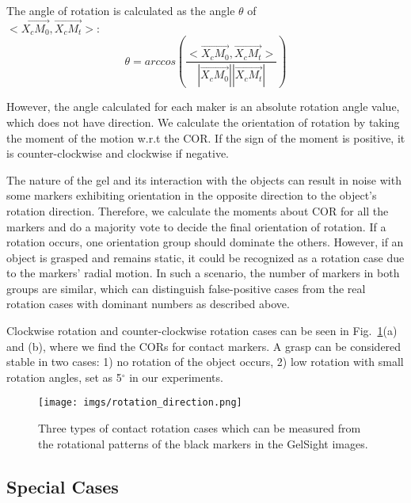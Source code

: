 The angle of rotation is calculated as the angle $\theta$ of\\
 $<\overrightarrow{X_c M_{0}},\overrightarrow{X_c M_t}>$:
\begin{equation}
    \theta = arccos(\frac{<\overrightarrow{X_c M_{0}},\overrightarrow{X_c M_t}>}{|\overrightarrow{X_c M_{0}}||\overrightarrow{X_c M_t}|})
\end{equation}

However, the angle calculated for each maker is an absolute rotation angle value, which does not have direction. We calculate the orientation of rotation by taking the moment of the motion w.r.t the COR. If the sign of the moment is positive, it is counter-clockwise and clockwise if negative. 

The nature of the gel and its interaction with the objects can result in noise with some markers exhibiting orientation in the opposite direction to the object's rotation direction. Therefore, we calculate the moments about COR for all the markers and do a majority vote to decide the final orientation of rotation. If a rotation occurs, one orientation group should dominate the others. However, if an object is grasped and remains static, it could be recognized as a rotation case due to the markers' radial motion. In such a scenario, the number of markers in both groups are similar, which can distinguish false-positive cases from the real rotation cases with dominant numbers as described above.

Clockwise rotation and counter-clockwise rotation cases can be seen in Fig.~\ref{fig:COR}(a) and (b), where we find the CORs for contact markers. A grasp can be considered stable in two cases: 1) no rotation of the object occurs, 2) low rotation with small rotation angles, set as 5$^{\circ}$ in our experiments.
\begin{figure}[t]
    \centering
    \texttt{[image: imgs/rotation\_direction.png]}
    \caption{Three types of contact rotation cases which can be measured from the rotational patterns of the black markers in the GelSight images.}
    \label{fig:COR}
    \vspace{-2mm}
\end{figure}

\subsection{Special Cases}
